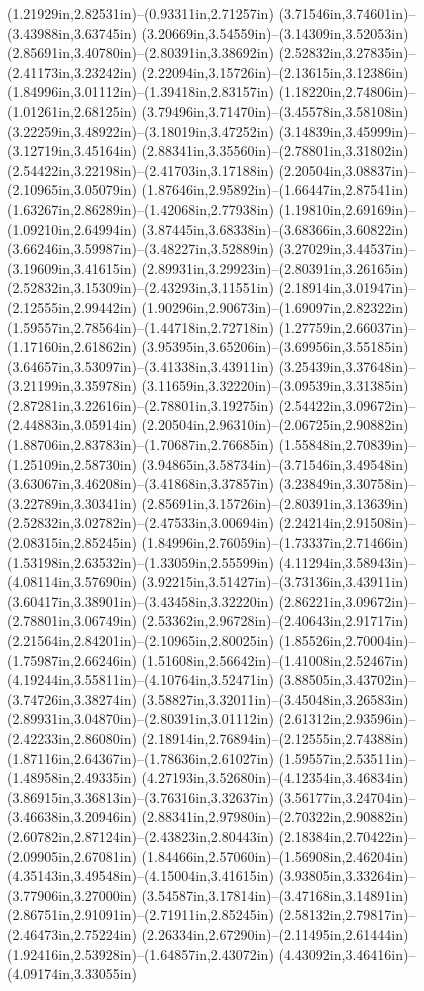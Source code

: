 (1.21929in,2.82531in)--(0.93311in,2.71257in) (3.71546in,3.74601in)--(3.43988in,3.63745in) (3.20669in,3.54559in)--(3.14309in,3.52053in) (2.85691in,3.40780in)--(2.80391in,3.38692in) (2.52832in,3.27835in)--(2.41173in,3.23242in) (2.22094in,3.15726in)--(2.13615in,3.12386in) (1.84996in,3.01112in)--(1.39418in,2.83157in) (1.18220in,2.74806in)--(1.01261in,2.68125in) (3.79496in,3.71470in)--(3.45578in,3.58108in) (3.22259in,3.48922in)--(3.18019in,3.47252in) (3.14839in,3.45999in)--(3.12719in,3.45164in) (2.88341in,3.35560in)--(2.78801in,3.31802in) (2.54422in,3.22198in)--(2.41703in,3.17188in) (2.20504in,3.08837in)--(2.10965in,3.05079in) (1.87646in,2.95892in)--(1.66447in,2.87541in) (1.63267in,2.86289in)--(1.42068in,2.77938in) (1.19810in,2.69169in)--(1.09210in,2.64994in) (3.87445in,3.68338in)--(3.68366in,3.60822in) (3.66246in,3.59987in)--(3.48227in,3.52889in) (3.27029in,3.44537in)--(3.19609in,3.41615in) (2.89931in,3.29923in)--(2.80391in,3.26165in) (2.52832in,3.15309in)--(2.43293in,3.11551in) (2.18914in,3.01947in)--(2.12555in,2.99442in) (1.90296in,2.90673in)--(1.69097in,2.82322in) (1.59557in,2.78564in)--(1.44718in,2.72718in) (1.27759in,2.66037in)--(1.17160in,2.61862in) (3.95395in,3.65206in)--(3.69956in,3.55185in) (3.64657in,3.53097in)--(3.41338in,3.43911in) (3.25439in,3.37648in)--(3.21199in,3.35978in) (3.11659in,3.32220in)--(3.09539in,3.31385in) (2.87281in,3.22616in)--(2.78801in,3.19275in) (2.54422in,3.09672in)--(2.44883in,3.05914in) (2.20504in,2.96310in)--(2.06725in,2.90882in) (1.88706in,2.83783in)--(1.70687in,2.76685in) (1.55848in,2.70839in)--(1.25109in,2.58730in) (3.94865in,3.58734in)--(3.71546in,3.49548in) (3.63067in,3.46208in)--(3.41868in,3.37857in) (3.23849in,3.30758in)--(3.22789in,3.30341in) (2.85691in,3.15726in)--(2.80391in,3.13639in) (2.52832in,3.02782in)--(2.47533in,3.00694in) (2.24214in,2.91508in)--(2.08315in,2.85245in) (1.84996in,2.76059in)--(1.73337in,2.71466in) (1.53198in,2.63532in)--(1.33059in,2.55599in) (4.11294in,3.58943in)--(4.08114in,3.57690in) (3.92215in,3.51427in)--(3.73136in,3.43911in) (3.60417in,3.38901in)--(3.43458in,3.32220in) (2.86221in,3.09672in)--(2.78801in,3.06749in) (2.53362in,2.96728in)--(2.40643in,2.91717in) (2.21564in,2.84201in)--(2.10965in,2.80025in) (1.85526in,2.70004in)--(1.75987in,2.66246in) (1.51608in,2.56642in)--(1.41008in,2.52467in) (4.19244in,3.55811in)--(4.10764in,3.52471in) (3.88505in,3.43702in)--(3.74726in,3.38274in) (3.58827in,3.32011in)--(3.45048in,3.26583in) (2.89931in,3.04870in)--(2.80391in,3.01112in) (2.61312in,2.93596in)--(2.42233in,2.86080in) (2.18914in,2.76894in)--(2.12555in,2.74388in) (1.87116in,2.64367in)--(1.78636in,2.61027in) (1.59557in,2.53511in)--(1.48958in,2.49335in) (4.27193in,3.52680in)--(4.12354in,3.46834in) (3.86915in,3.36813in)--(3.76316in,3.32637in) (3.56177in,3.24704in)--(3.46638in,3.20946in) (2.88341in,2.97980in)--(2.70322in,2.90882in) (2.60782in,2.87124in)--(2.43823in,2.80443in) (2.18384in,2.70422in)--(2.09905in,2.67081in) (1.84466in,2.57060in)--(1.56908in,2.46204in) (4.35143in,3.49548in)--(4.15004in,3.41615in) (3.93805in,3.33264in)--(3.77906in,3.27000in) (3.54587in,3.17814in)--(3.47168in,3.14891in) (2.86751in,2.91091in)--(2.71911in,2.85245in) (2.58132in,2.79817in)--(2.46473in,2.75224in) (2.26334in,2.67290in)--(2.11495in,2.61444in) (1.92416in,2.53928in)--(1.64857in,2.43072in) (4.43092in,3.46416in)--(4.09174in,3.33055in) 